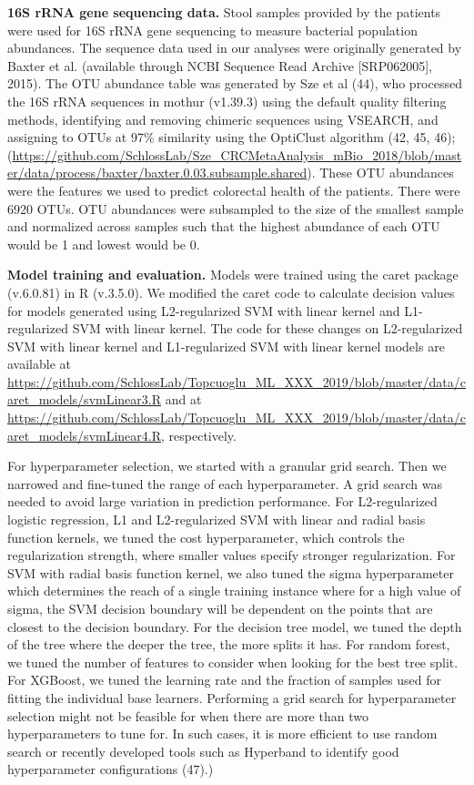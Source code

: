 \documentclass[11pt,]{article}
\begin{document}
\textbf{16S rRNA gene sequencing data.} Stool samples provided by the
patients were used for 16S rRNA gene sequencing to measure bacterial
population abundances. The sequence data used in our analyses were
originally generated by Baxter et al. (available through NCBI Sequence
Read Archive {[}SRP062005{]}, 2015). The OTU abundance table was
generated by Sze et al (44), who processed the 16S rRNA sequences in
mothur (v1.39.3) using the default quality filtering methods,
identifying and removing chimeric sequences using VSEARCH, and assigning
to OTUs at 97\% similarity using the OptiClust algorithm (42, 45, 46);
(\url{https://github.com/SchlossLab/Sze_CRCMetaAnalysis_mBio_2018/blob/master/data/process/baxter/baxter.0.03.subsample.shared}).
These OTU abundances were the features we used to predict colorectal
health of the patients. There were 6920 OTUs. OTU abundances were
subsampled to the size of the smallest sample and normalized across
samples such that the highest abundance of each OTU would be 1 and
lowest would be 0.

\textbf{Model training and evaluation.} Models were trained using the
caret package (v.6.0.81) in R (v.3.5.0). We modified the caret code to
calculate decision values for models generated using L2-regularized SVM
with linear kernel and L1-regularized SVM with linear kernel. The code
for these changes on L2-regularized SVM with linear kernel and
L1-regularized SVM with linear kernel models are available at
\url{https://github.com/SchlossLab/Topcuoglu_ML_XXX_2019/blob/master/data/caret_models/svmLinear3.R}
and at
\url{https://github.com/SchlossLab/Topcuoglu_ML_XXX_2019/blob/master/data/caret_models/svmLinear4.R},
respectively.

For hyperparameter selection, we started with a granular grid search.
Then we narrowed and fine-tuned the range of each hyperparameter. A grid
search was needed to avoid large variation in prediction performance.
For L2-regularized logistic regression, L1 and L2-regularized SVM with
linear and radial basis function kernels, we tuned the cost
hyperparameter, which controls the regularization strength, where
smaller values specify stronger regularization. For SVM with radial
basis function kernel, we also tuned the sigma hyperparameter which
determines the reach of a single training instance where for a high
value of sigma, the SVM decision boundary will be dependent on the
points that are closest to the decision boundary. For the decision tree
model, we tuned the depth of the tree where the deeper the tree, the
more splits it has. For random forest, we tuned the number of features
to consider when looking for the best tree split. For XGBoost, we tuned
the learning rate and the fraction of samples used for fitting the
individual base learners. Performing a grid search for hyperparameter
selection might not be feasible for when there are more than two
hyperparameters to tune for. In such cases, it is more efficient to use
random search or recently developed tools such as Hyperband to identify
good hyperparameter configurations (47).)
\end{document}
